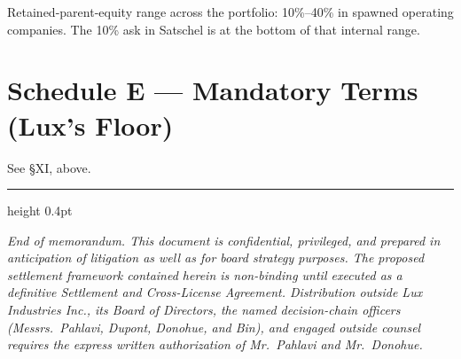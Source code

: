 \documentclass[11pt,letterpaper]{article}
\begin{document}
Retained-parent-equity range across the portfolio: 10\%--40\% in
spawned operating companies. The 10\% ask in Satschel is at the
bottom of that internal range.

\section*{Schedule E --- Mandatory Terms (Lux's Floor)}

See \S XI, above.

\vfill
\hrule height 0.4pt
\vspace{0.5em}
\begin{small}
\textit{End of memorandum. This document is confidential, privileged,
and prepared in anticipation of litigation as well as for board
strategy purposes. The proposed settlement framework contained
herein is non-binding until executed as a definitive Settlement and
Cross-License Agreement. Distribution outside Lux Industries Inc.,
its Board of Directors, the named decision-chain officers (Messrs.\
Pahlavi, Dupont, Donohue, and Bin), and engaged outside counsel
requires the express written authorization of Mr.\ Pahlavi and Mr.\
Donohue.}
\end{small}
\end{document}
